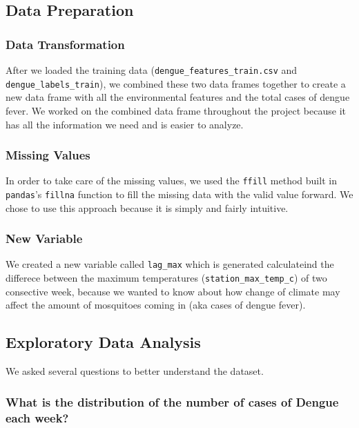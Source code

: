 \documentclass[11pt]{article}
\begin{document}
    \subsection{Data Preparation}\label{data-preparation}

    \subsubsection{Data Transformation}\label{data-transformation}

After we loaded the training data (\texttt{dengue\_features\_train.csv}
and \texttt{dengue\_labels\_train}), we combined these two data frames
together to create a new data frame with all the environmental features
and the total cases of dengue fever. We worked on the combined data
frame throughout the project because it has all the information we need
and is easier to analyze.

    \subsubsection{Missing Values}\label{missing-values}

In order to take care of the missing values, we used the \texttt{ffill}
method built in \texttt{pandas}'s \texttt{fillna} function to fill the
missing data with the valid value forward. We chose to use this approach
because it is simply and fairly intuitive.

    \subsubsection{New Variable}\label{new-variable}

We created a new variable called \texttt{lag\_max} which is generated
calculateind the differece between the maximum temperatures
(\texttt{station\_max\_temp\_c}) of two consective week, because we
wanted to know about how change of climate may affect the amount of
mosquitoes coming in (aka cases of dengue fever).

    \subsection{Exploratory Data Analysis}\label{exploratory-data-analysis}

    We asked several questions to better understand the dataset.

\subsubsection{What is the distribution of the number of cases of Dengue
each
week?}\label{what-is-the-distribution-of-the-number-of-cases-of-dengue-each-week}
\end{document}
